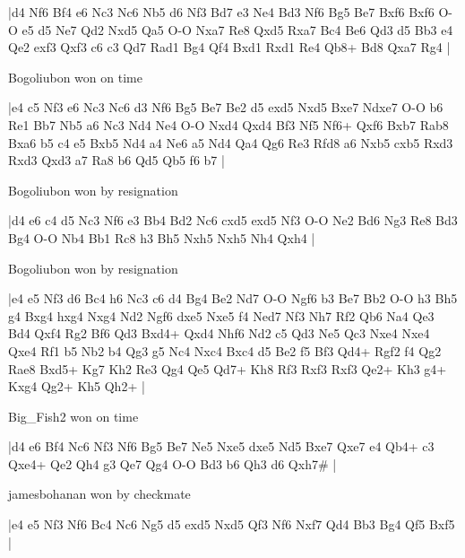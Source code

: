 \makegametitle
|d4 Nf6 Bf4 e6 Nc3 Nc6 Nb5 d6 Nf3 Bd7 e3 Ne4 Bd3 Nf6 Bg5 Be7 Bxf6 Bxf6 O-O e5 d5 Ne7 Qd2 Nxd5 Qa5 O-O Nxa7 Re8 Qxd5 Rxa7 Bc4 Be6 Qd3 d5 Bb3 e4 Qe2 exf3 Qxf3 c6 c3 Qd7 Rad1 Bg4 Qf4 Bxd1 Rxd1 Re4 Qb8+ Bd8 Qxa7 Rg4  |

\showboard

Bogoliubon won on time

\makegametitle
|e4 c5 Nf3 e6 Nc3 Nc6 d3 Nf6 Bg5 Be7 Be2 d5 exd5 Nxd5 Bxe7 Ndxe7 O-O b6 Re1 Bb7 Nb5 a6 Nc3 Nd4 Ne4 O-O Nxd4 Qxd4 Bf3 Nf5 Nf6+ Qxf6 Bxb7 Rab8 Bxa6 b5 c4 e5 Bxb5 Nd4 a4 Ne6 a5 Nd4 Qa4 Qg6 Re3 Rfd8 a6 Nxb5 cxb5 Rxd3 Rxd3 Qxd3 a7 Ra8 b6 Qd5 Qb5 f6 b7  |

\showboard

Bogoliubon won by resignation

\makegametitle
|d4 e6 c4 d5 Nc3 Nf6 e3 Bb4 Bd2 Nc6 cxd5 exd5 Nf3 O-O Ne2 Bd6 Ng3 Re8 Bd3 Bg4 O-O Nb4 Bb1 Rc8 h3 Bh5 Nxh5 Nxh5 Nh4 Qxh4  |

\showboard

Bogoliubon won by resignation

\makegametitle
|e4 e5 Nf3 d6 Bc4 h6 Nc3 c6 d4 Bg4 Be2 Nd7 O-O Ngf6 b3 Be7 Bb2 O-O h3 Bh5 g4 Bxg4 hxg4 Nxg4 Nd2 Ngf6 dxe5 Nxe5 f4 Ned7 Nf3 Nh7 Rf2 Qb6 Na4 Qe3 Bd4 Qxf4 Rg2 Bf6 Qd3 Bxd4+ Qxd4 Nhf6 Nd2 c5 Qd3 Ne5 Qc3 Nxe4 Nxe4 Qxe4 Rf1 b5 Nb2 b4 Qg3 g5 Nc4 Nxc4 Bxc4 d5 Be2 f5 Bf3 Qd4+ Rgf2 f4 Qg2 Rae8 Bxd5+ Kg7 Kh2 Re3 Qg4 Qe5 Qd7+ Kh8 Rf3 Rxf3 Rxf3 Qe2+ Kh3 g4+ Kxg4 Qg2+ Kh5 Qh2+  |

\showboard

Big\_Fish2 won on time

\makegametitle
|d4 e6 Bf4 Nc6 Nf3 Nf6 Bg5 Be7 Ne5 Nxe5 dxe5 Nd5 Bxe7 Qxe7 e4 Qb4+ c3 Qxe4+ Qe2 Qh4 g3 Qe7 Qg4 O-O Bd3 b6 Qh3 d6 Qxh7\#  |

\showboard

jamesbohanan won by checkmate

\makegametitle
|e4 e5 Nf3 Nf6 Bc4 Nc6 Ng5 d5 exd5 Nxd5 Qf3 Nf6 Nxf7 Qd4 Bb3 Bg4 Qf5 Bxf5  |

